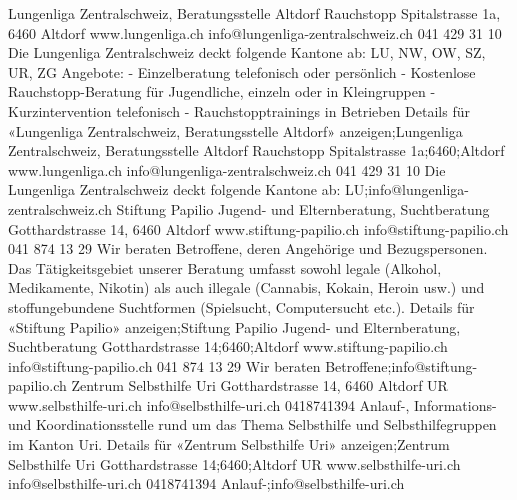 Lungenliga Zentralschweiz, Beratungsstelle Altdorf Rauchstopp Spitalstrasse 1a, 6460 Altdorf www.lungenliga.ch info@lungenliga-zentralschweiz.ch 041 429 31 10 Die Lungenliga Zentralschweiz deckt folgende Kantone ab: LU, NW, OW, SZ, UR, ZG Angebote: - Einzelberatung telefonisch oder persönlich - Kostenlose Rauchstopp-Beratung für Jugendliche, einzeln oder in Kleingruppen - Kurzintervention telefonisch - Rauchstopptrainings in Betrieben Details für «Lungenliga Zentralschweiz, Beratungsstelle Altdorf» anzeigen;Lungenliga Zentralschweiz, Beratungsstelle Altdorf Rauchstopp Spitalstrasse 1a;6460;Altdorf www.lungenliga.ch info@lungenliga-zentralschweiz.ch 041 429 31 10 Die Lungenliga Zentralschweiz deckt folgende Kantone ab: LU;info@lungenliga-zentralschweiz.ch
Stiftung Papilio Jugend- und Elternberatung, Suchtberatung Gotthardstrasse 14, 6460 Altdorf www.stiftung-papilio.ch info@stiftung-papilio.ch 041 874 13 29 Wir beraten Betroffene, deren Angehörige und Bezugspersonen. Das Tätigkeitsgebiet unserer Beratung umfasst sowohl legale (Alkohol, Medikamente, Nikotin) als auch illegale (Cannabis, Kokain, Heroin usw.) und stoffungebundene Suchtformen (Spielsucht, Computersucht etc.). Details für «Stiftung Papilio» anzeigen;Stiftung Papilio Jugend- und Elternberatung, Suchtberatung Gotthardstrasse 14;6460;Altdorf www.stiftung-papilio.ch info@stiftung-papilio.ch 041 874 13 29 Wir beraten Betroffene;info@stiftung-papilio.ch
Zentrum Selbsthilfe Uri Gotthardstrasse 14, 6460 Altdorf UR www.selbsthilfe-uri.ch info@selbsthilfe-uri.ch 0418741394 Anlauf-, Informations- und Koordinationsstelle rund um das Thema Selbsthilfe und Selbsthilfegruppen im Kanton Uri. Details für «Zentrum Selbsthilfe Uri» anzeigen;Zentrum Selbsthilfe Uri Gotthardstrasse 14;6460;Altdorf UR www.selbsthilfe-uri.ch info@selbsthilfe-uri.ch 0418741394 Anlauf-;info@selbsthilfe-uri.ch
